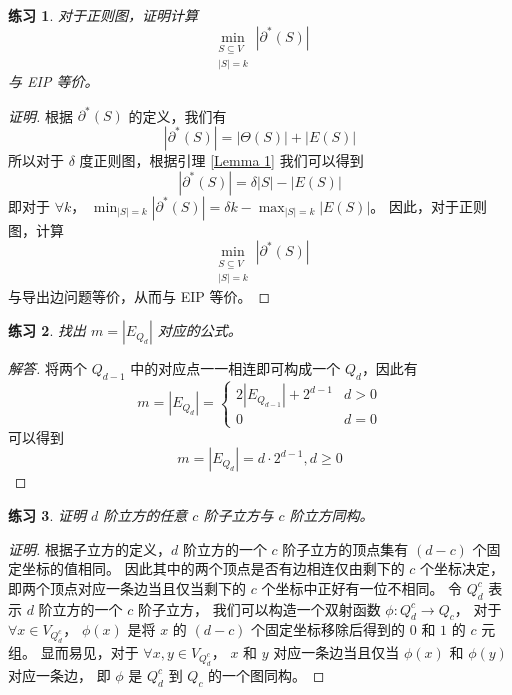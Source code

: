 \documentclass[12pt, a4paper]{article}
\newtheorem{exercisewithanswer}{练习}
\newenvironment{answer}[1][Answer]{
	\begin{proof}[#1]
	\let\qed\relax
}{
	\end{proof}
}
\begin{document}
\begin{exercisewithanswer}
对于正则图，证明计算
\begin{equation*}
\min_{\substack{
	S \subseteq V \\
	|S| = k
}}|\partial^\ast(S)|
\end{equation*}
与 EIP 等价。
\end{exercisewithanswer}

\begin{proof}[证明]
根据 $\partial^\ast(S)$ 的定义，我们有
\begin{equation*}
|\partial^\ast(S)| = |\Theta(S)| + |E(S)|
\end{equation*}
所以对于 $\delta$ 度正则图，根据引理 \ref{Lemma 1} 我们可以得到
\begin{equation*}
|\partial^\ast(S)| = \delta |S| - |E(S)|
\end{equation*}
即对于 $\forall k$，
$\min_{|S| = k} |\partial^\ast(S)| = \delta k - \max_{|S| = k} |E(S)|$。
因此，对于正则图，计算
\begin{equation*}
\min_{\substack{
	S \subseteq V \\
	|S| = k
}}|\partial^\ast(S)|
\end{equation*}
与导出边问题等价，从而与 EIP 等价。
\end{proof}

\begin{exercisewithanswer}
找出 $m = |E_{Q_d}|$ 对应的公式。
\end{exercisewithanswer}

\begin{answer}[解答]
将两个 $Q_{d - 1}$ 中的对应点一一相连即可构成一个 $Q_d$，因此有
\begin{equation*}
m = |E_{Q_d}| = \begin{cases}
	2 \left|E_{Q_{d - 1}}\right| + 2^{d - 1} & d > 0 \\
	0                                        & d = 0
\end{cases}
\end{equation*}
可以得到
\begin{equation*}
m = |E_{Q_d}| = d \cdot 2^{d - 1}, d \ge 0
\end{equation*}
\end{answer}

\begin{exercisewithanswer}
证明 $d$ 阶立方的任意 $c$ 阶子立方与 $c$ 阶立方同构。
\end{exercisewithanswer}

\begin{proof}[证明]
根据子立方的定义，$d$ 阶立方的一个 $c$ 阶子立方的顶点集有 $(d - c)$ 个固定坐标的值相同。
因此其中的两个顶点是否有边相连仅由剩下的 $c$ 个坐标决定，
即两个顶点对应一条边当且仅当剩下的 $c$ 个坐标中正好有一位不相同。
令 $Q_d^c$ 表示 $d$ 阶立方的一个 $c$ 阶子立方，
我们可以构造一个双射函数 $\phi \colon Q_d^c \rightarrow Q_c$，
对于 $\forall x \in V_{Q_d^c}$，
$\phi(x)$ 是将 $x$ 的 $(d - c)$ 个固定坐标移除后得到的 $0$ 和 $1$ 的 $c$ 元组。
显而易见，对于 $\forall x, y \in V_{Q_d^c}$，
$x$ 和 $y$ 对应一条边当且仅当 $\phi(x)$ 和 $\phi(y)$ 对应一条边，
即 $\phi$ 是 $Q_d^c$ 到 $Q_c$ 的一个图同构。
\end{proof}
\end{document}
